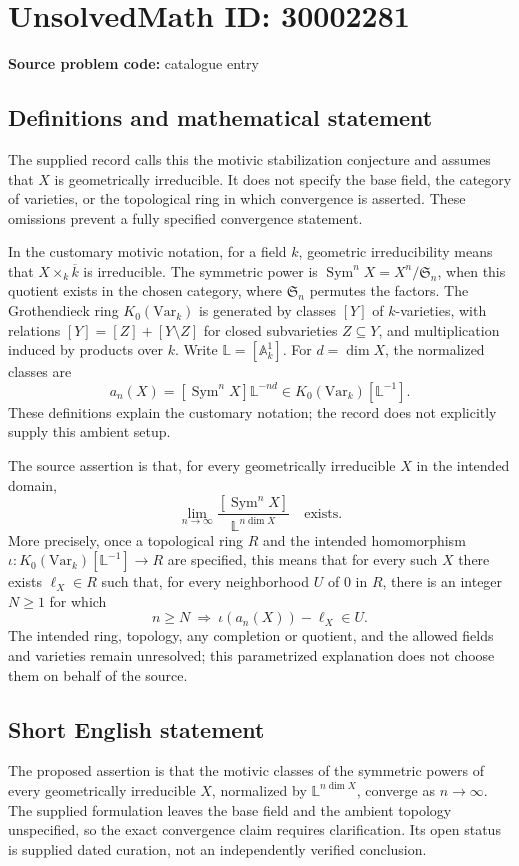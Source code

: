 \documentclass[11pt]{article}
\begin{document}
\section*{UnsolvedMath ID: 30002281}
\textbf{Source problem code:} catalogue entry
\subsection{Definitions and mathematical statement}
The supplied record calls this the motivic stabilization conjecture and assumes that \(X\) is geometrically irreducible. It does not specify the base field, the category of varieties, or the topological ring in which convergence is asserted. These omissions prevent a fully specified convergence statement.

In the customary motivic notation, for a field \(k\), geometric irreducibility means that \(X\times_k\overline{k}\) is irreducible. The symmetric power is \(\operatorname{Sym}^nX=X^n/\mathfrak S_n\), when this quotient exists in the chosen category, where \(\mathfrak S_n\) permutes the factors. The Grothendieck ring \(K_0(\mathrm{Var}_k)\) is generated by classes \([Y]\) of \(k\)-varieties, with relations \([Y]=[Z]+[Y\setminus Z]\) for closed subvarieties \(Z\subseteq Y\), and multiplication induced by products over \(k\). Write \(\mathbb L=[\mathbb A^1_k]\). For \(d=\dim X\), the normalized classes are
\[
 a_n(X)=[\operatorname{Sym}^nX]\mathbb L^{-nd}
 \in K_0(\mathrm{Var}_k)[\mathbb L^{-1}].
\]
These definitions explain the customary notation; the record does not explicitly supply this ambient setup.

The source assertion is that, for every geometrically irreducible \(X\) in the intended domain,
\[
 \lim_{n\to\infty}\frac{[\operatorname{Sym}^nX]}{\mathbb L^{n\dim X}}
 \quad\text{exists}.
\]
More precisely, once a topological ring \(R\) and the intended homomorphism \(\iota:K_0(\mathrm{Var}_k)[\mathbb L^{-1}]\to R\) are specified, this means that for every such \(X\) there exists \(\ell_X\in R\) such that, for every neighborhood \(U\) of \(0\) in \(R\), there is an integer \(N\geq1\) for which
\[
 n\geq N\ \Longrightarrow\ \iota(a_n(X))-\ell_X\in U.
\]
The intended ring, topology, any completion or quotient, and the allowed fields and varieties remain unresolved; this parametrized explanation does not choose them on behalf of the source.
\subsection{Short English statement}
The proposed assertion is that the motivic classes of the symmetric powers of every geometrically irreducible \(X\), normalized by \(\mathbb L^{n\dim X}\), converge as \(n\to\infty\). The supplied formulation leaves the base field and the ambient topology unspecified, so the exact convergence claim requires clarification. Its open status is supplied dated curation, not an independently verified conclusion.
\end{document}
